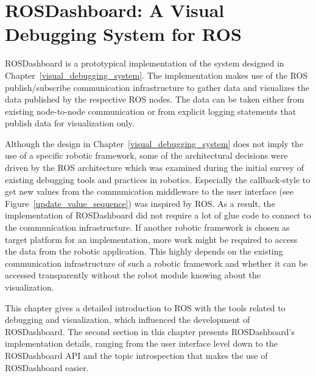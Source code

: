 \chapter[ROSDashboard: A Visual Debugging System for ROS]{ROSDashboard: A Visual\\Debugging System for ROS}
\label{rosdashboard}

ROSDashboard is a prototypical implementation of the system designed in Chapter~\ref{visual_debugging_system}. The implementation makes use of the ROS publish/subscribe communication infrastructure to gather data and visualizes the data published by the respective ROS nodes. The data can be taken either from existing node-to-node communication or from explicit logging statements that publish data for visualization only.

Although the design in Chapter~\ref{visual_debugging_system} does not imply the use of a specific robotic framework, some of the architectural decisions were driven by the ROS architecture which was examined during the initial survey of existing debugging tools and practices in robotics. Especially the callback-style to get new values from the communication middleware to the user interface (see Figure~\ref{update_value_sequence}) was inspired by ROS. As a result, the implementation of ROSDashboard did not require a lot of glue code to connect to the communication infrastructure. If another robotic framework is chosen as target platform for an implementation, more work might be required to access the data from the robotic application. This highly depends on the existing communication infrastructure of such a robotic framework and whether it can be accessed transparently without the robot module knowing about the visualization.

This chapter gives a detailed introduction to ROS with the tools related to debugging and visualization, which influenced the development of ROSDashboard. The second section in this chapter presents ROSDashboard's implementation details, ranging from the user interface level down to the ROSDashboard API and the topic introspection that makes the use of ROSDashboard easier.


